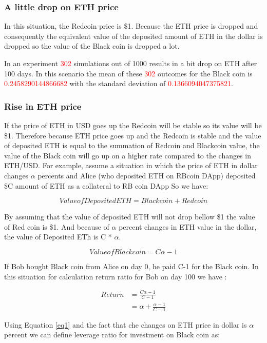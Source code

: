 \subsubsection{A little drop on ETH price}
In this situation, the Redcoin price is \$1. Because the ETH price is dropped and consequently the equivalent value of the deposited amount of ETH in the dollar is dropped so the value of the Black coin is dropped a lot.

In an experiment \textcolor{red}{302} simulations out of 1000 results in a bit drop on ETH after 100 days. In this scenario the mean of these \textcolor{red}{302} outcomes for the Black coin is \textcolor{red}{0.2458290144866682} with the standard deviation of \textcolor{red}{0.1366094047375821}. 

\subsubsection{Rise in ETH price}
If the price of ETH in USD goes up the Redcoin will be stable so its value will be \$1. Therefore because ETH price goes up and the Redcoin is stable and the value of deposited ETH is equal to the summation of Redcoin and Blackcoin value, the value of the Black coin will go up on a higher rate compared to the changes in ETH/USD. For example, assume a situation in which the price of ETH in dollar changes $\alpha$ percents and Alice (who deposited ETH on RBcoin DApp) deposited \$C amount of ETH as a collateral to RB coin DApp So we have:

\[Value of Deposited ETH = Black coin + Red coin\]

By assuming that the value of deposited ETH will not drop bellow \$1 the value of Red coin is \$1. And because of $\alpha$ percent changes in ETH value in the dollar, the value of Deposited ETh is C * $\alpha$.

\[Value of Black coin = C\alpha - 1\]

If Bob bought Black coin from Alice on day 0, he paid C-1 for the Black coin. In this situation for calculation return ratio for Bob on day 100 we have :

\begin{equation} \label{eq1}
\begin{split}
Return & = \frac{C\alpha - 1}{C-1} \\
 & = \alpha + \frac{\alpha - 1}{C-1}
\end{split}
\end{equation}

Using Equation \ref{eq1} and the fact that che changes on ETH price in dollar is $\alpha$ percent we can define leverage ratio for investment on Black coin as:

